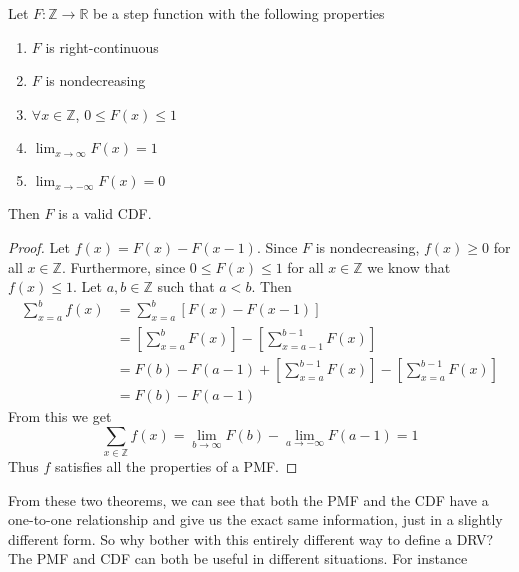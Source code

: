 \begin{theorem}
    Let $F:\mathbb Z\to\mathbb R$ be a step function with the following properties
    \begin{enumerate}
        \item $F$ is right-continuous
        \item $F$ is nondecreasing
        \item $\forall x\in\mathbb Z$, $0\le F(x) \le 1$
        \item $\displaystyle\lim_{x\to\infty} F(x)=1$
        \item $\displaystyle\lim_{x\to -\infty} F(x)=0$
    \end{enumerate}
    Then $F$ is a valid CDF.
    \begin{proof}
        Let $f(x)=F(x)-F(x-1)$. Since $F$ is nondecreasing, $f(x)\ge 0$ for all $x\in\mathbb Z$. Furthermore, since $0\le F(x) \le 1$ for all $x\in\mathbb Z$ we know that $f(x)\le 1$. Let $a,b\in\mathbb Z$ such that $a<b$. Then
        \begin{align*}
            \sum_{x=a}^b f(x) & = \sum_{x=a}^b\left[F(x)-F(x-1)\right]
            \\                & = \left[\sum_{x=a}^b F(x)\right] - \left[\sum_{x=a-1}^{b-1} F(x)\right]
            \\                & = F(b)-F(a-1)+\left[\sum_{x=a}^{b-1} F(x)\right] - \left[\sum_{x=a}^{b-1} F(x)\right]
            \\                & = F(b)-F(a-1)
        \end{align*}
        From this we get
        \[
            \sum_{x\in\mathbb Z} f(x)=\lim_{b\to \infty} F(b) - \lim_{a\to -\infty} F(a-1)=1
        \]
        Thus $f$ satisfies all the properties of a PMF.
    \end{proof}
\end{theorem}
From these two theorems, we can see that both the PMF and the CDF have a one-to-one relationship and give us the exact same information, just in a slightly different form. So why bother with this entirely different way to define a DRV? The PMF and CDF can both be useful in different situations. For instance

